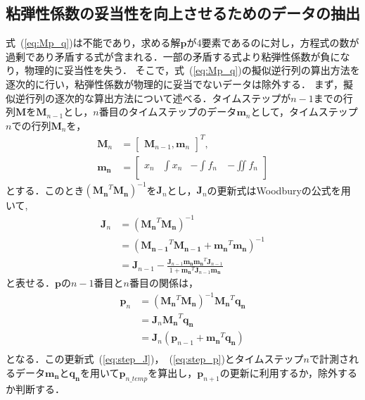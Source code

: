 \documentclass[a4paper]{jarticle}
\begin{document}
\subsection{粘弾性係数の妥当性を向上させるためのデータの抽出}\label{subsec:downsample}
式~(\ref{eq:Mp_q})は不能であり，求める解$\mathbf{p}$が4要素であるのに対し，方程式の数が過剰であり矛盾する式が含まれる．一部の矛盾する式より粘弾性係数が負になり，物理的に妥当性を失う．
そこで，式~(\ref{eq:Mp_q})の擬似逆行列の算出方法を逐次的に行い，粘弾性係数が物理的に妥当でないデータは除外する．
まず，擬似逆行列の逐次的な算出方法について述べる．タイムステップが$n-1$までの行列$\mathbf{M}$を$\mathbf{M}_{n-1}$とし，$n$番目のタイムステップのデータ$\mathbf{m}_n$として，タイムステップ$n$での行列$\mathbf{M}_n$を，
\begin{equation}
    \begin{aligned}
        \mathbf{M}_n &= \begin{bmatrix}
            \mathbf{M}_{n-1} ,\mathbf{m}_n
        \end{bmatrix}^{T},\\
        \mathbf{m_{n}}&=\begin{bmatrix}
            x_{n} & \int{x_{n}} & -\int{f_{n}}\ & -\iint{f_{n}}\\
        \end{bmatrix}
    \end{aligned}
\end{equation}
とする．このとき$(\mathbf{M_{n}}^{T}\mathbf{M_{n}})^{-1}$を$\mathbf{J}_{n}$とし，$\mathbf{J}_{n}$の更新式はWoodburyの公式を用いて,
\begin{equation}
    \begin{aligned}
    \mathbf{J}_n &= (\mathbf{M_{n}}^{T}\mathbf{M_{n}})^{-1}\\
                 &= (\mathbf{M_{n-1}}^{T}\mathbf{M_{n-1}} + \mathbf{m_{n}}^{T}\mathbf{m_{n}})^{-1}\\
                 &= \mathbf{J}_{n-1} - \frac{\mathbf{J}_{n-1}\mathbf{m_{n}}\mathbf{m_{n}}^{T}\mathbf{J}_{n-1}}{1+\mathbf{m_{n}}^{T}\mathbf{J}_{n-1}\mathbf{m_{n}}}
    \end{aligned}
    \label{eq:step_J}
\end{equation}
と表せる．$\mathbf{p}$の$n-1$番目と$n$番目の関係は，
\begin{equation}
    \begin{aligned}
    \mathbf{p}_n &= (\mathbf{M_{n}}^{T}\mathbf{M_{n}})^{-1}\mathbf{M_{n}}^{T}\mathbf{q_{n}}\\
                 &= \mathbf{J}_{n}\mathbf{M_{n}}^{T}\mathbf{q_{n}}\\
                 &= \mathbf{J}_{n}(\mathbf{p}_{n-1}+\mathbf{m_{n}}^{T}\mathbf{q_{n}})\\
    \end{aligned}
    \label{eq:step_p}
\end{equation}
となる．この更新式~(\ref{eq:step_J})，~(\ref{eq:step_p})とタイムステップ$n$で計測されるデータ$\mathbf{m_{n}}$と$\mathbf{q_{n}}$を用いて$\mathbf{p}_{n\_temp}$を算出し，$\mathbf{p}_{n+1}$の更新に利用するか，除外するか判断する．
\end{document}
